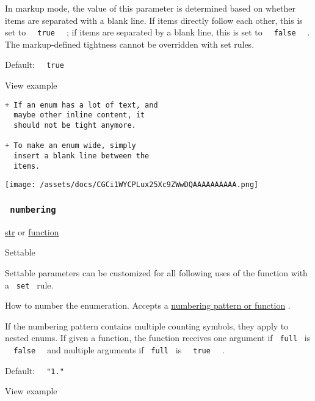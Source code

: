 In markup mode, the value of this parameter is determined based on
whether items are separated with a blank line. If items directly follow
each other, this is set to \texttt{\ }{\texttt{\ true\ }}\texttt{\ } ;
if items are separated by a blank line, this is set to
\texttt{\ }{\texttt{\ false\ }}\texttt{\ } . The markup-defined
tightness cannot be overridden with set rules.

Default: \texttt{\ }{\texttt{\ true\ }}\texttt{\ }


View example

\begin{verbatim}
+ If an enum has a lot of text, and
  maybe other inline content, it
  should not be tight anymore.

+ To make an enum wide, simply
  insert a blank line between the
  items.
\end{verbatim}

\texttt{[image: /assets/docs/CGCi1WYCPLux25Xc9ZWwDQAAAAAAAAAA.png]}

\subsubsection{\texorpdfstring{\texttt{\ numbering\ }}{ numbering }}\label{parameters-numbering}

\href{/docs/reference/foundations/str/}{str} {or}
\href{/docs/reference/foundations/function/}{function}

{{ Settable }}

\label{parameters-numbering-settable-tooltip}
Settable parameters can be customized for all following uses of the
function with a \texttt{\ set\ } rule.

How to number the enumeration. Accepts a
\href{/docs/reference/model/numbering/}{numbering pattern or function} .

If the numbering pattern contains multiple counting symbols, they apply
to nested enums. If given a function, the function receives one argument
if \texttt{\ full\ } is \texttt{\ }{\texttt{\ false\ }}\texttt{\ } and
multiple arguments if \texttt{\ full\ } is
\texttt{\ }{\texttt{\ true\ }}\texttt{\ } .

Default: \texttt{\ }{\texttt{\ "1."\ }}\texttt{\ }


View example

